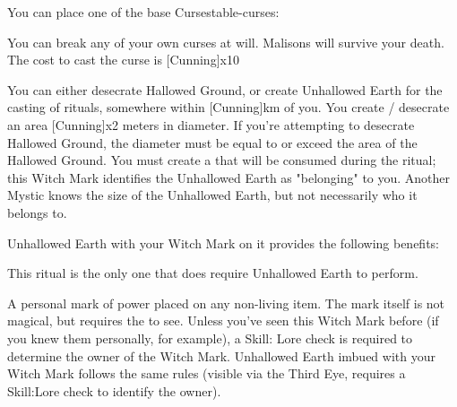 You can place one of the base {Curses}{table-curses}:



You can break any of your own curses at will. Malisons will survive your death.  The cost to cast the curse is [Cunning]x10\AU


\OCCULT[
  Name=Unhallowed Earth,
  Link=occultism-unhallowed-earth,
  Success=2+ (plus see below),
  Cost=66\AU
]

You can either desecrate Hallowed Ground, or create Unhallowed Earth for the casting of rituals, somewhere within [Cunning]km of you.  You create / desecrate an area [Cunning]x2 meters in diameter.  If you're attempting to desecrate Hallowed Ground, the diameter must be equal to or exceed the area of the Hallowed Ground.  You must create a  that will be consumed during the ritual; this Witch Mark identifies the Unhallowed Earth as "belonging" to you.  Another Mystic knows the size of the Unhallowed Earth, but not necessarily who it belongs to.

Unhallowed Earth with your Witch Mark on it provides the following benefits:


This ritual is the only one that does  require Unhallowed Earth to perform. 



\OCCULT[
  Name=Witch Mark,
  Link=occultism-witch-mark,
  Success=2,
  Cost=66\AG
]

A personal mark of power placed on any non-living item.  The mark itself is not magical, but requires the  to see. Unless you've seen this Witch Mark before (if you knew them personally, for example), a Skill: Lore check is required to determine the owner of the Witch Mark.  Unhallowed Earth imbued with your Witch Mark follows the same rules (visible via the Third Eye, requires a Skill:Lore check to identify the owner).


